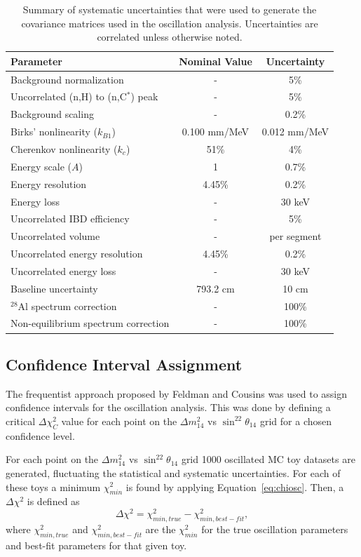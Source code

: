 \begin{table}[H]
\centering
\begin{tabular}{lcc}
	\hline 
	\textbf{Parameter} & \textbf{Nominal Value} & \textbf{Uncertainty} \\ 
	\hline 
	Background normalization  & - & 5\% \\ 
	Uncorrelated (n,H) to (n,C$^*$) peak & - & 5\% \\ 
	Background scaling & - & 0.2\% \\ 
	\hline 
	Birks' nonlinearity ($k_{B1}$) & 0.100 mm/MeV & 0.012 mm/MeV \\ 
	Cherenkov nonlinearity ($k_c$) & 51\% & 4\% \\ 
	Energy scale ($A$) & 1 & 0.7\% \\ 
	Energy resolution & 4.45\% & 0.2\% \\ 
	Energy loss & - & 30 keV \\ 
	Uncorrelated IBD efficiency & - & 5\% \\ 
	Uncorrelated volume & - & per segment \\ 
	Uncorrelated energy resolution & 4.45\% & 0.2\% \\ 
	Uncorrelated energy loss  & - & 30 keV \\ 
	Baseline uncertainty & 793.2 cm & 10 cm \\ 
	\hline 
	$^{28}$Al spectrum correction & - & 100\% \\ 
	Non-equilibrium spectrum correction & - & 100\% \\ 
	\hline 
\end{tabular} 
\caption{Summary of systematic uncertainties that were used to generate the covariance matrices used in the oscillation analysis. Uncertainties are correlated unless otherwise noted.}
\label{tab:sysunc}
\end{table}

\subsection{Confidence Interval Assignment}

The frequentist approach proposed by Feldman and Cousins \cite{PhysRevD.57.3873} was used to assign confidence intervals for the oscillation analysis.
This was done by defining a critical $\Delta\chi^2_C$ value for each point on the $\Delta m^2_{14}$ vs $\sin^22\theta_{14}$ grid for a chosen confidence level.

For each point on the $\Delta m^2_{14}$ vs $\sin^22\theta_{14}$ grid 1000 oscillated MC toy datasets are generated, fluctuating the statistical and systematic uncertainties.
For each of these toys a minimum $\chi^2_{min}$ is found by applying Equation~\ref{eq:chiosc}.
Then, a $\Delta\chi^2$ is defined as
\begin{equation}
	\Delta\chi^2 = \chi^2_{min,true} - \chi^2_{min,best-fit},
\end{equation}
where $\chi^2_{min,true}$ and $\chi^2_{min,best-fit}$ are the $\chi^2_{min}$ for the true oscillation parameters and best-fit parameters for that given toy.

